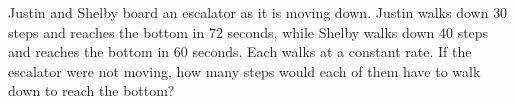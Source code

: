 Justin and Shelby board an escalator as it is moving down. Justin walks down $30$ steps and reaches the bottom in $72$ seconds, while Shelby walks down $40$ steps and reaches the bottom in $60$ seconds. Each walks at a constant rate. If the escalator were not moving, how many steps would each of them have to walk down to reach the bottom?
